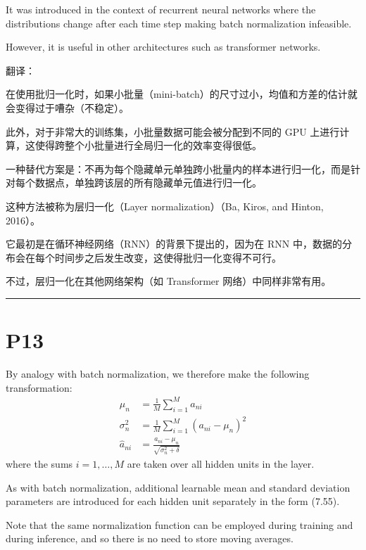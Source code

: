 \documentclass{article}
\begin{document}
It was introduced in the context of recurrent neural networks where the distributions change after each time step making batch normalization infeasible. 

However, it is useful in other architectures such as transformer networks.

{\color{red}
翻译：

在使用批归一化时，如果小批量（mini-batch）的尺寸过小，均值和方差的估计就会变得过于嘈杂（不稳定）。

此外，对于非常大的训练集，小批量数据可能会被分配到不同的 GPU 上进行计算，这使得跨整个小批量进行全局归一化的效率变得很低。

一种替代方案是：不再为每个隐藏单元单独跨小批量内的样本进行归一化，而是针对每个数据点，单独跨该层的所有隐藏单元值进行归一化。

这种方法被称为层归一化（Layer normalization）（Ba, Kiros, and Hinton, 2016）。

它最初是在循环神经网络（RNN）的背景下提出的，因为在 RNN 中，数据的分布会在每个时间步之后发生改变，这使得批归一化变得不可行。

不过，层归一化在其他网络架构（如 Transformer 网络）中同样非常有用。

}

\noindent\rule{\linewidth}{0.4pt}

\section{P13}

By analogy with batch normalization, we therefore make the following transformation:
\begin{align}
    \mu_n &= \frac{1}{M} \sum_{i=1}^M a_{ni} \tag{7.58} \\
    \sigma_n^2 &= \frac{1}{M} \sum_{i=1}^M (a_{ni} - \mu_n)^2 \tag{7.59} \\
    \widehat{a}_{ni} &= \frac{a_{ni} - \mu_n}{\sqrt{\sigma_n^2 + \delta}} \tag{7.60}
\end{align}
where the sums $i = 1, \dots, M$ are taken over all hidden units in the layer. 

As with batch normalization, additional learnable mean and standard deviation parameters are introduced for each hidden unit separately in the form (7.55). 

Note that the same normalization function can be employed during training and during inference, and so there is no need to store moving averages. 
\end{document}
